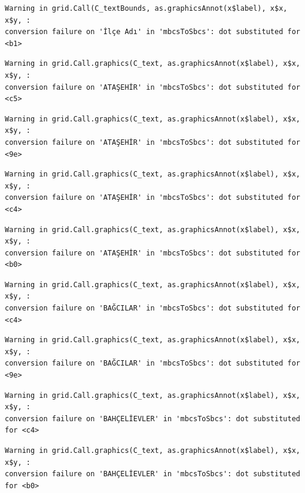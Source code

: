\documentclass[
  11pt,
  a4paper,
  DIV=11,
  numbers=noendperiod]{scrartcl}
\begin{document}
\begin{verbatim}
Warning in grid.Call(C_textBounds, as.graphicsAnnot(x$label), x$x, x$y, :
conversion failure on 'İlçe Adı' in 'mbcsToSbcs': dot substituted for <b1>
\end{verbatim}

\begin{verbatim}
Warning in grid.Call.graphics(C_text, as.graphicsAnnot(x$label), x$x, x$y, :
conversion failure on 'ATAŞEHİR' in 'mbcsToSbcs': dot substituted for <c5>
\end{verbatim}

\begin{verbatim}
Warning in grid.Call.graphics(C_text, as.graphicsAnnot(x$label), x$x, x$y, :
conversion failure on 'ATAŞEHİR' in 'mbcsToSbcs': dot substituted for <9e>
\end{verbatim}

\begin{verbatim}
Warning in grid.Call.graphics(C_text, as.graphicsAnnot(x$label), x$x, x$y, :
conversion failure on 'ATAŞEHİR' in 'mbcsToSbcs': dot substituted for <c4>
\end{verbatim}

\begin{verbatim}
Warning in grid.Call.graphics(C_text, as.graphicsAnnot(x$label), x$x, x$y, :
conversion failure on 'ATAŞEHİR' in 'mbcsToSbcs': dot substituted for <b0>
\end{verbatim}

\begin{verbatim}
Warning in grid.Call.graphics(C_text, as.graphicsAnnot(x$label), x$x, x$y, :
conversion failure on 'BAĞCILAR' in 'mbcsToSbcs': dot substituted for <c4>
\end{verbatim}

\begin{verbatim}
Warning in grid.Call.graphics(C_text, as.graphicsAnnot(x$label), x$x, x$y, :
conversion failure on 'BAĞCILAR' in 'mbcsToSbcs': dot substituted for <9e>
\end{verbatim}

\begin{verbatim}
Warning in grid.Call.graphics(C_text, as.graphicsAnnot(x$label), x$x, x$y, :
conversion failure on 'BAHÇELİEVLER' in 'mbcsToSbcs': dot substituted for <c4>
\end{verbatim}

\begin{verbatim}
Warning in grid.Call.graphics(C_text, as.graphicsAnnot(x$label), x$x, x$y, :
conversion failure on 'BAHÇELİEVLER' in 'mbcsToSbcs': dot substituted for <b0>
\end{verbatim}
\end{document}
